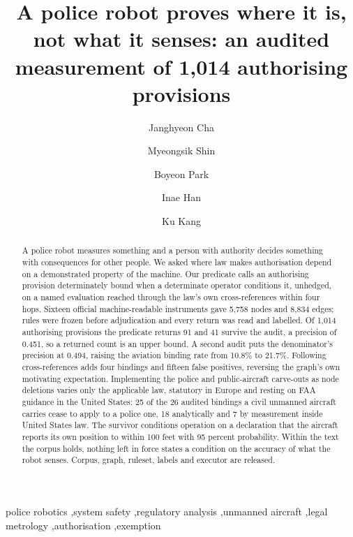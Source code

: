 \documentclass[1p,times,authoryear]{elsarticle}
\begin{document}
\begin{frontmatter}

\title{A police robot proves where it is, not what it senses: an audited measurement of 1{,}014 authorising provisions}

\author[knpa]{Janghyeon Cha}
\author[cbrn]{Myeongsik Shin}
\author[cbrn]{Boyeon Park}
\author[cbrn]{Inae Han}
\author[cbrn]{Ku Kang}
\address[knpa]{Korean National Police Agency, Seoul, Republic of Korea}
\address[cbrn]{Chemical, Biological, Radiological and Nuclear (CBRN) Defense Research Institute, Seoul, Republic of Korea}

\begin{abstract}
A police robot measures something and a person with authority decides something with consequences for other people. We asked where law makes authorisation depend on a demonstrated property of the machine. Our predicate calls an authorising provision determinately bound when a determinate operator conditions it, unhedged, on a named evaluation reached through the law's own cross-references within four hops. Sixteen official machine-readable instruments gave 5,758 nodes and 8,834 edges; rules were frozen before adjudication and every return was read and labelled. Of 1,014 authorising provisions the predicate returns 91 and 41 survive the audit, a precision of 0.451, so a returned count is an upper bound. A second audit puts the denominator's precision at 0.494, raising the aviation binding rate from 10.8\% to 21.7\%. Following cross-references adds four bindings and fifteen false positives, reversing the graph's own motivating expectation. Implementing the police and public-aircraft carve-outs as node deletions varies only the applicable law, statutory in Europe and resting on FAA guidance in the United States: 25 of the 26 audited bindings a civil unmanned aircraft carries cease to apply to a police one, 18 analytically and 7 by measurement inside United States law. The survivor conditions operation on a declaration that the aircraft reports its own position to within 100 feet with 95 percent probability. Within the text the corpus holds, nothing left in force states a condition on the accuracy of what the robot senses. Corpus, graph, ruleset, labels and executor are released.
\end{abstract}

\begin{keyword}
police robotics \sep system safety \sep regulatory analysis \sep unmanned aircraft \sep legal metrology \sep authorisation \sep exemption
\end{keyword}

\end{frontmatter}







\appendix




\end{document}
